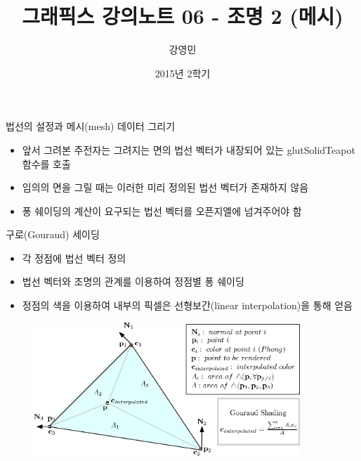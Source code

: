 \documentclass{beamer}
\title[3D 그래픽스 프로그래밍]{그래픽스 강의노트 06 - 조명 2 (메시)}
\author{강영민}
\institute{동명대학교}
\date{2015년 2학기}
\begin{document}
\begin{frame}
  \titlepage
\end{frame}





\begin{frame}[fragile]{법선의 설정과 메시(mesh) 데이터 그리기}

\begin{itemize}
\item 앞서 그려본 주전자는 그려지는 면의 법선 벡터가 내장되어 있는 {\sf glutSolidTeapot} 함수를 호출
\item 임의의 면을 그릴 때는 이러한 미리 정의된 법선 벡터가 존재하지 않음
\item 퐁 쉐이딩의 계산이 요구되는 법선 벡터를 오픈지엘에 넘겨주어야 함
\end{itemize}

\end{frame}



\begin{frame}[fragile]{구로(Gouraud) 세이딩}

\begin{itemize}
\item 각 정점에 법선 벡터 정의
\item 법선 벡터와 조명의 관계를 이용하여 정점별 퐁 쉐이딩
\item 정점의 색을 이용하여 내부의 픽셀은 선형보간(linear interpolation)을 통해 얻음
\end{itemize}

\begin{figure}[h!]
  \centering
    \includegraphics[height=5cm]{OGL_light/interpolatedColors.eps}
\end{figure}
\end{frame}
\end{document}
